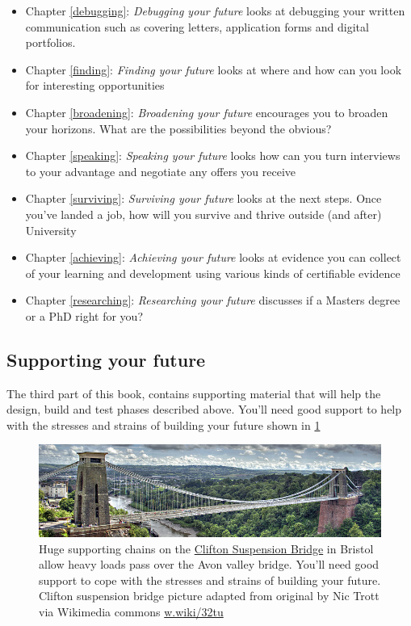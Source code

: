 \documentclass[
]{book}
\providecommand{\tightlist}{%
  \setlength{\itemsep}{0pt}\setlength{\parskip}{0pt}}
\begin{document}
\begin{itemize}
\tightlist
\item
  Chapter \ref{debugging}: \emph{Debugging your future} looks at debugging your written communication such as covering letters, application forms and digital portfolios.
\item
  Chapter \ref{finding}: \emph{Finding your future} looks at where and how can you look for interesting opportunities
\item
  Chapter \ref{broadening}: \emph{Broadening your future} encourages you to broaden your horizons. What are the possibilities beyond the obvious?
\item
  Chapter \ref{speaking}: \emph{Speaking your future} looks how can you turn interviews to your advantage and negotiate any offers you receive
\item
  Chapter \ref{surviving}: \emph{Surviving your future} looks at the next steps. Once you've landed a job, how will you survive and thrive outside (and after) University
\item
  Chapter \ref{achieving}: \emph{Achieving your future} looks at evidence you can collect of your learning and development using various kinds of certifiable evidence
\item
  Chapter \ref{researching}: \emph{Researching your future} discusses if a Masters degree or a PhD right for you?
\end{itemize}

\hypertarget{partiii}{%
\subsection{Supporting your future}\label{partiii}}

The third part of this book, contains supporting material that will help the design, build and test phases described above. You'll need good support to help with the stresses and strains of building your future shown in \ref{fig:clifton-fig}

\begin{figure}

{\centering \includegraphics[width=1\linewidth]{images/clifton} 

}

\caption{Huge supporting chains on the \href{https://en.wikipedia.org/wiki/Clifton_Suspension_Bridge}{Clifton Suspension Bridge} in Bristol allow heavy loads pass over the Avon valley bridge. You'll need good support to cope with the stresses and strains of building your future. Clifton suspension bridge picture adapted from original by Nic Trott via Wikimedia commons \href{https://w.wiki/32tu}{w.wiki/32tu}}\label{fig:clifton-fig}
\end{figure}
\end{document}
